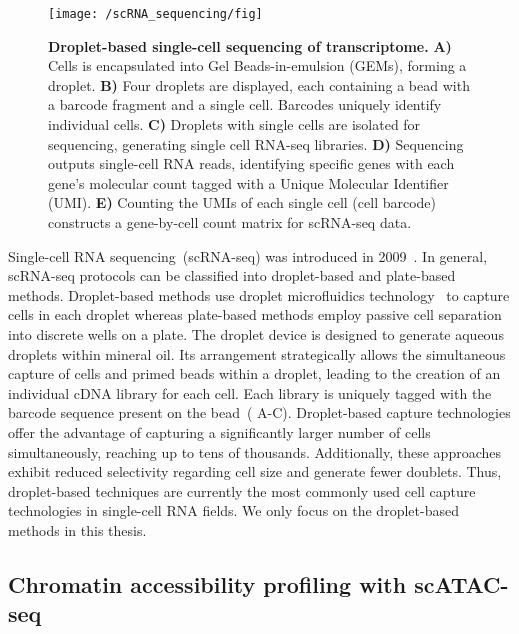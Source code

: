 \begin{figure}[!ht]
	\centering
	\texttt{[image: /scRNA\_sequencing/fig]}
	\vspace{0.1cm}
	\caption[Droplet-based single-cell sequencing of transcriptome.]{\textbf{Droplet-based single-cell sequencing of transcriptome.} \textbf{A)} Cells is encapsulated into Gel Beads-in-emulsion (GEMs), forming a droplet. \textbf{B)} Four droplets are displayed, each containing a bead with a barcode fragment and a single cell. Barcodes uniquely identify individual cells. \textbf{C)} Droplets with single cells are isolated for sequencing, generating single cell RNA-seq libraries. \textbf{D)} Sequencing outputs single-cell RNA reads, identifying specific genes with each gene's molecular count tagged with a Unique Molecular Identifier (UMI). \textbf{E)} Counting the UMIs of each single cell (cell barcode) constructs a gene-by-cell count matrix for scRNA-seq data.}
	\label{fig:scRNA_to_count_matrix}
\end{figure}


Single-cell RNA sequencing~(scRNA-seq) was introduced in 2009~\citep{tang2009mrna}. In general, scRNA-seq protocols can be classified into droplet-based and plate-based methods. Droplet-based methods use droplet microfluidics technology~\citep{dropletcompare2019, droplet2019practice} to capture cells in each droplet whereas plate-based methods employ passive cell separation into discrete wells on a plate. The droplet device is designed to generate aqueous droplets within mineral oil. Its arrangement strategically allows the simultaneous capture of cells and primed beads within a droplet, leading to the creation of an individual cDNA library for each cell. Each library is uniquely tagged with the barcode sequence present on the bead~( A-C). Droplet-based capture technologies offer the advantage of capturing a significantly larger number of cells simultaneously, reaching up to tens of thousands. Additionally, these approaches exhibit reduced selectivity regarding cell size and generate fewer doublets. Thus, droplet-based techniques are currently the most commonly used cell capture technologies in single-cell RNA fields. We only focus on the droplet-based methods in this thesis.

\subsection{Chromatin accessibility profiling with scATAC-seq}
\label{background:sec1:scATAC}

